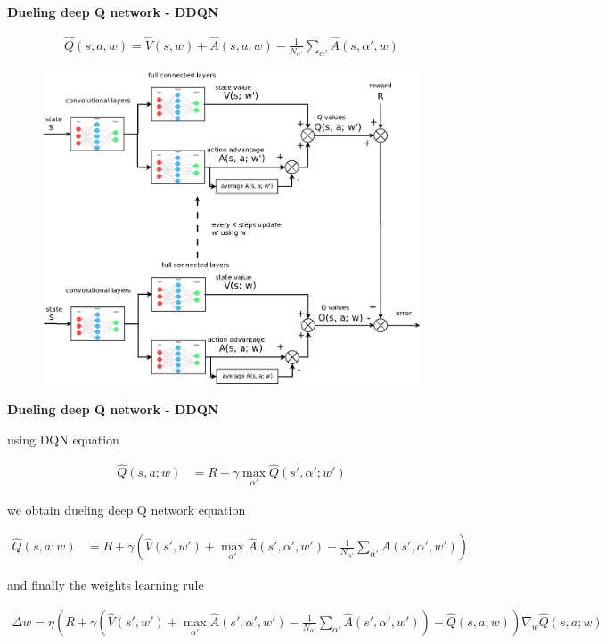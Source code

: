 \documentclass[xcolor=dvipsnames]{beamer}
\begin{document}
\begin{frame}{\bf Dueling deep Q network - DDQN}

\begin{align*}
  \hat{Q}(s, a, w) = \hat{V}(s, w) + \hat{A}(s, a, w) - \frac{1}{N_{\alpha'}} \sum_{\alpha'} \hat{A}(s, \alpha', w)
\end{align*}

\begin{figure}[!htb]
  \centering
  \includegraphics[scale=0.18]{../../diagrams/dueling_dqn_1.png}
  \label{img:ddqn_full}
\end{figure}

\end{frame}


\begin{frame}{\bf Dueling deep Q network - DDQN}

using DQN equation

{\footnotesize
\begin{align*}
  \hat{Q}(s, a; w) &= R + \gamma \max \limits_{\alpha'} \hat{Q}(s', \alpha'; w')
\end{align*}
}

we obtain dueling deep Q network equation

{\footnotesize
\begin{align*}
  \hat{Q}(s, a; w)&= R + \gamma \left( \hat{V}(s', w') + \max \limits_{\alpha'} \hat{A}(s', \alpha', w') - \frac{1}{N_{\alpha'}} \sum_{\alpha'} \hat{A}(s', \alpha', w') \right)
\end{align*}
}

and finally the weights learning rule

{\tiny

\begin{align*}
  \Delta w = \eta \left( R + \gamma \left( \hat{V}(s', w') + \max \limits_{\alpha'} \hat{A}(s', \alpha', w') - \frac{1}{N_{\alpha'}} \sum_{\alpha'} \hat{A}(s', \alpha', w') \right) - \hat{Q}(s, a; w)\right) \nabla_w \hat{Q}(s, a; w)
\end{align*}
}
\end{frame}
\end{document}
